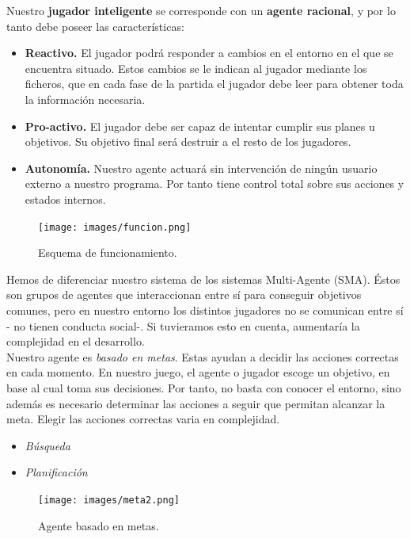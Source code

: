 \documentclass[a4paper,12pt,oneside]{book}
\begin{document}
Nuestro {\bf jugador inteligente} se corresponde con un {\bf agente racional}, y
por lo tanto debe poseer las características:
\begin{itemize}
\item {\bf Reactivo.} El jugador podrá responder a cambios en el
  entorno en el que se encuentra situado. Estos cambios se le indican
  al jugador mediante los ficheros, que en cada fase de la partida el
  jugador debe leer para obtener toda la información necesaria.
\item {\bf Pro-activo.} El jugador debe ser capaz de intentar cumplir
  sus planes u objetivos. Su objetivo final será destruir a el resto
  de los jugadores.
\item {\bf Autonomía.} Nuestro agente actuará sin intervención de
  ningún usuario externo a nuestro programa. Por tanto tiene control
  total sobre sus acciones y estados internos.
\end{itemize}

\begin{figure}[!h]
  \centering
  \texttt{[image: images/funcion.png]}
  \caption{Esquema de funcionamiento.}
\end{figure}
Hemos de diferenciar nuestro sistema de los sistemas Multi-Agente
(SMA). Éstos son grupos de agentes que interaccionan entre sí para
conseguir objetivos comunes, pero en nuestro entorno los distintos
jugadores no se comunican entre sí - no tienen conducta social-. Si
tuvieramos esto en cuenta, aumentaría la complejidad en el
desarrollo.\\

Nuestro agente es {\it basado en metas}. Estas ayudan a decidir las acciones
correctas en cada momento. En nuestro juego, el agente o jugador
escoge un objetivo, en base al cual toma sus decisiones. Por tanto, no
basta con conocer el entorno, sino además es necesario determinar las
acciones a seguir que permitan alcanzar la meta. Elegir las acciones
correctas varia en complejidad.
\begin{itemize}
\item {\it Búsqueda}
\item {\it Planificación}
\end{itemize}
\begin{figure}[!h]
  \centering
  \texttt{[image: images/meta2.png]}
  \caption{Agente basado en metas.}
\end{figure}
\end{document}
